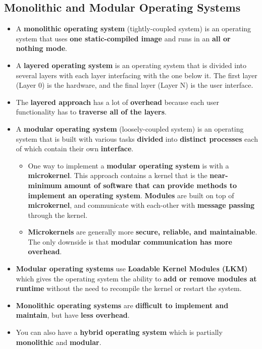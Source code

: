 \documentclass[16pt]{article}
\begin{document}
    \subsection*{Monolithic and Modular Operating Systems}
    \begin{itemize}
        \item A \textbf{monolithic operating system} (tightly-coupled system) is an operating system that uses \textbf{one static-compiled image} and runs in an \textbf{all or nothing mode}.
        \item A \textbf{layered operating system} is an operating system that is divided into several layers with each layer interfacing with the one below it. The first layer (Layer 0) is the hardware, and the final layer (Layer N) is the user interface.
        \item The \textbf{layered approach} has a lot of \textbf{overhead} because each user functionality has to \textbf{traverse all of the layers}.
        \item A \textbf{modular operating system} (loosely-coupled system) is an operating system that is built with various tasks \textbf{divided} into \textbf{distinct processes} each of which contain their own \textbf{interface}.
        \begin{itemize}
            \item One way to implement a \textbf{modular operating system} is with a \textbf{microkernel}. This approach contains a kernel that is the \textbf{near-minimum amount of software that can provide methods to implement an operating system}. \textbf{Modules} are built on top of \textbf{microkernel}, and communicate with each-other with \textbf{message passing} through the kernel.
            \item \textbf{Microkernels} are generally more \textbf{secure, reliable, and maintainable}. The only downside is that \textbf{modular communication has more overhead}.
        \end{itemize}
        \item \textbf{Modular operating systems} use \textbf{Loadable Kernel Modules (LKM)} which gives the operating system the ability to \textbf{add or remove modules at runtime} without the need to recompile the kernel or restart the system.
        \item \textbf{Monolithic operating systems} are \textbf{difficult to implement and maintain}, but have \textbf{less overhead}.
        \item You can also have a \textbf{hybrid operating system} which is partially \textbf{monolithic} and \textbf{modular}.
    \end{itemize}
\end{document}
